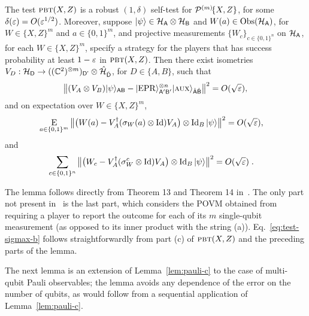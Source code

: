 \begin{lemma}\label{lem:pbt}
The test $\textsc{pbt}(X,Z)$ is a robust $(1,\delta)$ self-test 
for $\mathcal{P}^{(m)}\!\{X,Z\}$, for some $\delta(\varepsilon) = O(\varepsilon^{1/2})$. Moreover, suppose $|\psi\rangle\in\mathcal{H}_{\textsf{A}}\otimes \mathcal{H}_{\textsf{B}}$ and $W(a) \in \mathrm{Obs}(\mathcal{H}_{\textsf{A}})$, for $W\in \{X,Z\}^m$ and $a\in\{0,1\}^m$, and projective measurements $\{W_c\}_{c\in \{0,1\}^n}$ on $\mathcal{H}_{\textsf{A}}$, for each $W\in\{X,Z\}^m$, specify a strategy for the players that has success probability at least $1-\varepsilon$ in $\textsc{pbt}(X,Z)$. 
Then there exist isometries $V_D:\mathcal{H}_{\textsf{D}} \to ((\mathbb{C}^2)^{\otimes m})_{{\textsf{D'}}}  \otimes \hat{\mathcal{H}}_{\hat{{\textsf{D}}}}$, for $D\in\{A,B\}$, such that
$$\big\| (V_A \otimes V_B) |\psi\rangle_{{\textsf{AB}}} - |{\rm EPR}\rangle_{{\textsf{A}}'{\textsf{B}}'}^{\otimes n} |\textsc {aux}\rangle_{\hat{{\textsf{A}}}\hat{{\textsf{B}}}} \big\|^2 = O(\sqrt{\varepsilon}),$$
and on expectation over  $W\in \{X,Z\}^m$,
\begin{align}\label{eq:test-sigmax-a}
 \mathop{\textsc{E}}_{a\in\{0,1\}^m} \big\| \big(W(a) -V_A^\dagger (\sigma_W(a) \otimes \mathop{\rm Id}\nolimits) V_A\big) \otimes \mathop{\rm Id}\nolimits_B |\psi\rangle \big\|^2 &= O(\sqrt{\varepsilon}),
\end{align}
and
\begin{align}\label{eq:test-sigmax-b}
 \sum_{c\in\{0,1\}^n} \big\| \big(W_c -V_A^\dagger (\sigma_W^c \otimes \mathop{\rm Id}\nolimits) V_A\big) \otimes \mathop{\rm Id}\nolimits_B |\psi\rangle \big\|^2 &= O(\sqrt{\varepsilon})\;.
\end{align}
\end{lemma}

The lemma follows directly from Theorem 13 and Theorem 14 in~\cite{natarajan2016robust}. The only part not present in~\cite{natarajan2016robust} is the last part, which considers the POVM obtained from requiring a player to report the outcome for each of its $m$ single-qubit measurement (as opposed to its inner product with the string (a)). Eq.~\eqref{eq:test-sigmax-b} follows straightforwardly from part (c) of $\textsc{pbt}(X,Z)$ and the preceding parts of the lemma. 

The next lemma is an extension of Lemma~\ref{lem:pauli-c} to the case of multi-qubit Pauli observables; the lemma avoids any dependence of the error on the number of qubits, as would follow from a sequential application of Lemma~\ref{lem:pauli-c}.

